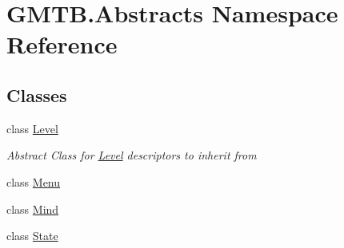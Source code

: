\hypertarget{namespace_g_m_t_b_1_1_abstracts}{}\section{G\+M\+T\+B.\+Abstracts Namespace Reference}
\label{namespace_g_m_t_b_1_1_abstracts}
\subsection*{Classes}
\begin{DoxyCompactItemize}
\item 
class \mbox{\hyperlink{class_g_m_t_b_1_1_abstracts_1_1_level}{Level}}
\begin{DoxyCompactList}\small\item\em Abstract Class for \mbox{\hyperlink{class_g_m_t_b_1_1_abstracts_1_1_level}{Level}} descriptors to inherit from \end{DoxyCompactList}\item 
class \mbox{\hyperlink{class_g_m_t_b_1_1_abstracts_1_1_menu}{Menu}}
\item 
class \mbox{\hyperlink{class_g_m_t_b_1_1_abstracts_1_1_mind}{Mind}}
\item 
class \mbox{\hyperlink{class_g_m_t_b_1_1_abstracts_1_1_state}{State}}
\end{DoxyCompactItemize}
